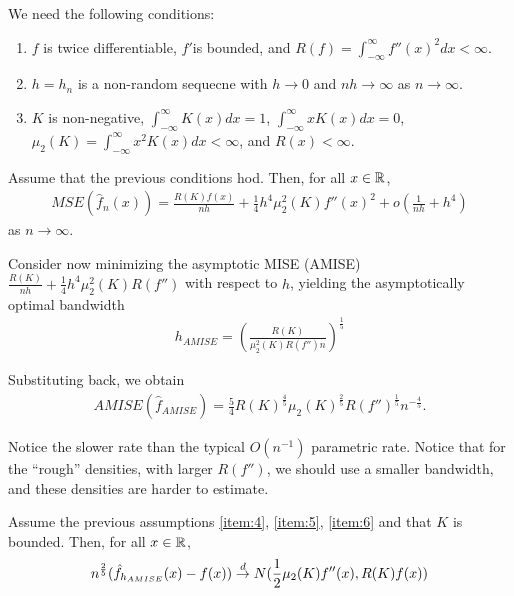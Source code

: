 We need the following conditions:
\begin{enumerate}
\item \label{item:4} $f$ is twice differentiable, $f'$is bounded, and $R(f) =
  \int_{-\infty}^{\infty} f''(x)^{2} dx < \infty$.
\item \label{item:5} $h = h_{n}$ is a non-random sequecne with $h \rightarrow 0$ and
  $nh \rightarrow \infty$ as $n \rightarrow \infty$.
\item \label{item:6} $K$ is non-negative, $\int_{-\infty}^{\infty} K(x) dx = 1$,
  $\int_{-\infty}^{\infty} x K(x) dx = 0$, $\mu_{2}(K) =
  \int_{-\infty}^{\infty} x^{2} K(x) dx < \infty$, and $R(x) < \infty$.
\end{enumerate}

\begin{thm}
  \label{defn:Introduction:3}
  Assume that the previous conditions hod. Then, for all $x \in \mathbb{R}$,
  \begin{align}
    \label{eq:15}
    MSE(\hat f_{n}(x)) = \frac{R(K) f(x)}{nh} + \frac{1}{4} h^{4}
    \mu_{2}^{2}(K) f''(x)^{2} + o(\frac{1}{nh} + h^{4})
  \end{align} as $n \rightarrow \infty$.
\end{thm}


Consider now minimizing the asymptotic MISE (AMISE) $\frac{R(K)}{nh} +
\frac{1}{4} h^{4} \mu_{2}^{2}(K) R(f'')$ with respect to $h$, yielding
the asymptotically optimal bandwidth
\begin{align}
  \label{eq:24}
  h_{AMISE} = (\frac{R(K)}{\mu_{2}^{2}(K) R(f'') n})^{\frac{1}{5}}
\end{align}

Substituting back, we obtain
\begin{align}
  \label{eq:25}
  AMISE(\hat f_{AMISE}) = \frac{5}{4} R(K)^{\frac{4}{5}}
  \mu_{2}(K)^{\frac{2}{5}} R(f'')^{\frac{1}{5}} n^{-\frac{4}{5}}.
\end{align}

Notice the slower rate than the typical $O(n^{-1})$
parametric rate.  Notice that for the ``rough'' densities, with larger
$R(f'')$, we should use a smaller bandwidth, and these densities are
harder to estimate.

\begin{thm}
  \label{defn:Introduction:4}
  Assume the previous assumptions \ref{item:4}, \ref{item:5},
  \ref{item:6} and that $K$ is bounded.  Then, for all $x \in \mathbb{R}$,
  \begin{equation}
    \label{eq:26}
    n^{\frac{2}{5}}(\hat f_{h_{AMISE}}(x) - f(x)) \overset{d}{\rightarrow}
    N(\frac{1}{2}\mu_{2}(K) f''(x), R(K) f(x))
  \end{equation}
\end{thm}

